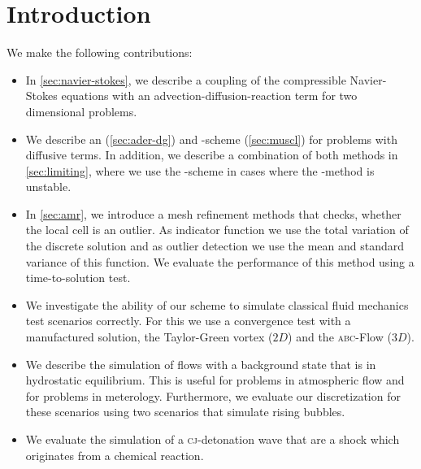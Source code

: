 \chapter{Introduction}\label{chap:introduction}

We make the following contributions:
\begin{itemize}
\item In \cref{sec:navier-stokes}, we describe a coupling of the compressible Navier-Stokes equations with an advection-diffusion-reaction term for two dimensional problems.
\item We describe an \aderdg{} (\cref{sec:ader-dg}) and \muscl{}-scheme (\cref{sec:muscl}) for problems with diffusive terms.
  In addition, we describe a combination of both methods in \cref{sec:limiting}, where we use the \muscl{}-scheme in cases where the \aderdg{}-method is unstable.
\item In \cref{sec:amr}, we introduce a mesh refinement methods that checks, whether the local cell is an outlier.
  As indicator function we use the total variation of the discrete solution and as outlier detection we use the mean and standard variance of this function.
  We evaluate the performance of this method using a time-to-solution test.
\item We investigate the ability of our scheme to simulate classical fluid mechanics test scenarios correctly.
  For this we use a convergence test with a manufactured solution, the Taylor-Green vortex ($2D$) and the \textsc{abc}-Flow ($3D$).
\item We describe the simulation of flows with a background state that is in hydrostatic equilibrium.
  This is useful for problems in atmospheric flow and for problems in meterology.
  Furthermore, we evaluate our discretization for these scenarios using two scenarios that simulate rising bubbles.
\item We evaluate the simulation of a \textsc{cj}-detonation wave that are a shock which originates from a chemical reaction.
\end{itemize}

